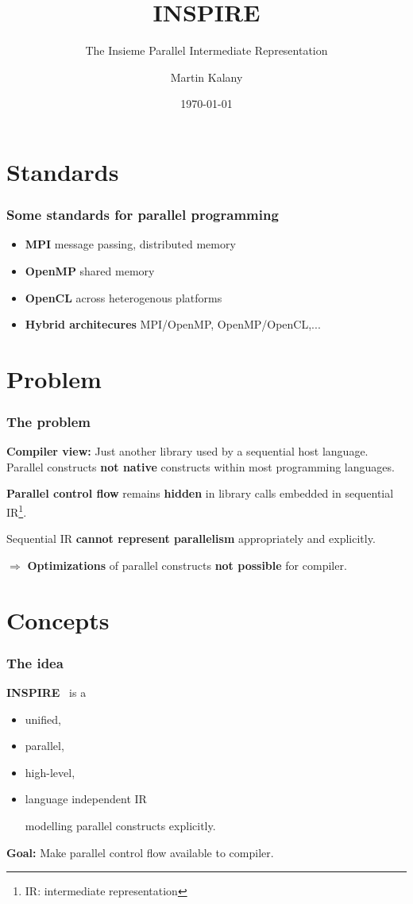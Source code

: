 \documentclass{beamer}
\title{INSPIRE}
\subtitle{The Insieme Parallel Intermediate Representation}
\author{Martin Kalany}
\institute
{
  Graduate student in Computer Science\\
  Vienna University of Technology\\
}
\date{\today}
\newcommand\fR[1]{\textcolor{red!80!black}{\textbf{#1}}}
\newcommand\fB[1]{\textcolor{blue!80!black}{\textbf{#1}}}
\newcommand\fG[1]{\textcolor{green!70!black}{\textbf{#1}}}
\begin{document}
\maketitle

\section{Standards}
\begin{frame}
\frametitle{Some standards for parallel programming}
\begin{itemize}
\item \fB{MPI} message passing, distributed memory
\item \fB{OpenMP} shared memory
\item \fB{OpenCL} across heterogenous platforms

\bigskip
\item \fB{Hybrid architecures} MPI/OpenMP, OpenMP/OpenCL,...
\end{itemize}
\end{frame}

\section{Problem}
\begin{frame}
\frametitle{The problem}

\fB{Compiler view:} Just another library used by a sequential host language. Parallel constructs \fR{not native} constructs within most programming languages.

\bigskip\pause
\fR{Parallel control flow} remains \fR{hidden} in library calls embedded in sequential IR\footnote{IR: intermediate representation}.

\bigskip\pause
Sequential IR \fR{cannot represent parallelism} appropriately and explicitly.

\bigskip\pause
$\Rightarrow$ \fR{Optimizations} of parallel constructs \fR{not possible} for compiler. 
\end{frame}

\section{Concepts}
\begin{frame}
\frametitle{The idea}
\fB{INSPIRE}~\cite{JordanPTKF13}  is a
\begin{itemize}
\item unified,
\item parallel,
\item high-level,
\item language independent IR

\smallskip
modelling parallel constructs explicitly.
\end{itemize}
\bigskip\pause
\fG{Goal:} Make parallel control flow available to compiler.
\end{frame}
\end{document}
